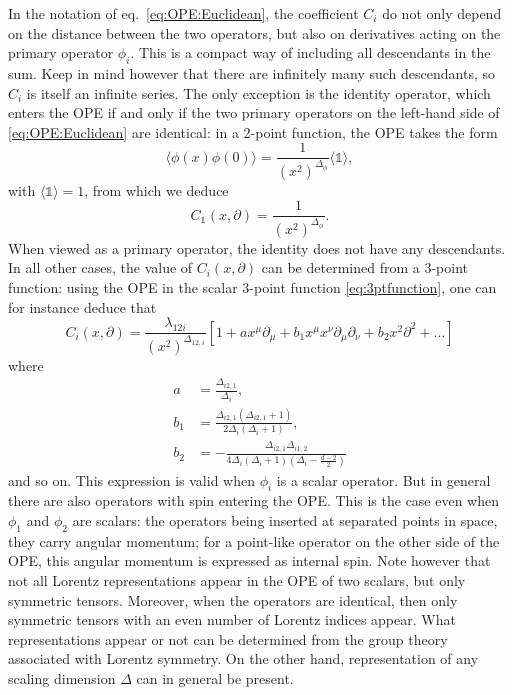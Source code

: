 \documentclass[a4paper,12pt]{article}
\numberwithin{equation}{section}
\begin{document}
In the notation of eq.~\eqref{eq:OPE:Euclidean}, the coefficient $C_i$ do not only depend on the distance between the two operators, but also on derivatives acting on the primary operator $\phi_i$. This is a compact way of including all descendants in the sum. Keep in mind however that there are infinitely many such descendants, so $C_i$ is itself an infinite series.
The only exception is the identity operator, which enters the OPE if and only if the two primary operators on the left-hand side of \eqref{eq:OPE:Euclidean} are identical: in a 2-point function, the OPE takes the form
\begin{equation}
	\langle \phi(x) \phi(0) \rangle = 
	\frac{1}{(x^2)^{\Delta_\phi}} \langle \mathds{1} \rangle,
\end{equation}
with $\langle \mathds{1} \rangle = 1$,
from which we deduce 
\begin{equation}
	C_\mathds{1}(x, \partial) = \frac{1}{(x^2)^{\Delta_\phi}}.
\end{equation}
When viewed as a primary operator, the identity does not have any descendants.
In all other cases, the value of $C_i(x, \partial)$ can be determined from a 3-point function: using the OPE in the scalar 3-point function \eqref{eq:3ptfunction}, one can for instance deduce that
\begin{equation}
	C_i(x, \partial)
	= \frac{\lambda_{12i}}{(x^2)^{\Delta_{12,i}}}
	\left[ 1 + a x^\mu \partial_\mu
	+ b_1 x^\mu x^\nu \partial_\mu \partial_\nu
	+ b_2 x^2 \partial^2 + \ldots \right]
\end{equation}
where
\begin{align}
	a &= \frac{\Delta_{i2,1}}{\Delta_i},
	\nonumber \\
	b_1 &= \frac{\Delta_{i2,1} (\Delta_{i2,1} + 1)}
	{2\Delta_i (\Delta_i + 1)},
	\\
	b_2 &= - \frac{\Delta_{i2,1} \Delta_{i1,2}}
	{4 \Delta_i (\Delta_i + 1) \left( \Delta_i - \frac{d-2}{2} \right)}
	\nonumber 
\end{align}
and so on. This expression is valid when $\phi_i$ is a scalar operator.
But in general there are also operators with spin entering the OPE. This is the case even when $\phi_1$ and $\phi_2$ are scalars: the operators being inserted at separated points in space, they carry angular momentum; for a point-like operator on the other side of the OPE, this angular momentum is expressed as internal spin.
Note however that not all Lorentz representations appear in the OPE of two scalars, but only symmetric tensors. Moreover, when the operators are identical, then only symmetric tensors with an even number of Lorentz indices appear. What representations appear or not can be determined from the group theory associated with Lorentz symmetry. On the other hand, representation of any scaling dimension $\Delta$ can in general be present.
\end{document}
